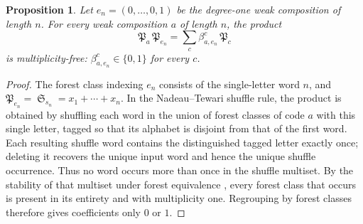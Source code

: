 \documentclass{amsart}
\newtheorem{proposition}[lemma]{Proposition}
\theoremstyle{definition}
\theoremstyle{remark}
\numberwithin{equation}{subsection}
\DeclareMathOperator{\sch}{\mathfrak{S}}
\newcommand{\forest}{\mathfrak{P}}
\begin{document}
\begin{proposition}\label{proposition:degreeone}
Let $e_n=(0,\ldots,0,1)$ be the degree-one weak composition of length $n$. For every weak composition $a$ of length $n$, the product
$$\forest_a\,\forest_{e_n}=\sum_c\beta_{a,e_n}^c\,\forest_c$$
is multiplicity-free: $\beta_{a,e_n}^c\in\{0,1\}$ for every $c$.
\end{proposition}
\begin{proof}
The forest class indexing $e_n$ consists of the single-letter word $n$, and $\forest_{e_n}=\sch_{s_n}=x_1+\cdots+x_n$. In the Nadeau--Tewari shuffle rule, the product is obtained by shuffling each word in the union of forest classes of code $a$ with this single letter, tagged so that its alphabet is disjoint from that of the first word. Each resulting shuffle word contains the distinguished tagged letter exactly once; deleting it recovers the unique input word and hence the unique shuffle occurrence. Thus no word occurs more than once in the shuffle multiset. By the stability of that multiset under forest equivalence \cite[Theorem~6.3]{nadeau2024forest}, every forest class that occurs is present in its entirety and with multiplicity one. Regrouping by forest classes therefore gives coefficients only $0$ or $1$.
\end{proof}

\providecommand{\pd}[3]{%
  \begin{tikzpicture}[baseline=(current bounding box.center),scale=0.4,thick,line cap=round]
    \foreach \i in {1,...,#1} {%
      \foreach \j in {1,...,#2} {%
        \draw[gray!30,very thin] ({\j-1},{#1-\i}) rectangle ({\j},{#1-\i+1});%
        \draw[blue!70] ({\j-1},{#1-\i+0.5}) arc[start angle=270,end angle=360,radius=0.5];%
        \draw[blue!70] ({\j-0.5},{#1-\i}) arc[start angle=180,end angle=90,radius=0.5];%
      }%
    }%
    \foreach \i/\j in {#3} {%
      \fill[white] ({\j-1},{#1-\i}) rectangle ({\j},{#1-\i+1});%
      \draw[gray!30,very thin] ({\j-1},{#1-\i}) rectangle ({\j},{#1-\i+1});%
      \draw[blue!70] ({\j-1},{#1-\i+0.5}) -- ({\j},{#1-\i+0.5});%
      \draw[blue!70] ({\j-0.5},{#1-\i}) -- ({\j-0.5},{#1-\i+1});%
      \pgfmathtruncatemacro{\pdlbl}{\i+\j-1}%
      \node[font=\Large\bfseries,text=green!60!black,fill=white,inner sep=0.5pt,circle,transform shape] at ({\j-0.5},{#1-\i+0.5}) {\pdlbl};%
    }%
  \end{tikzpicture}}
\end{document}
